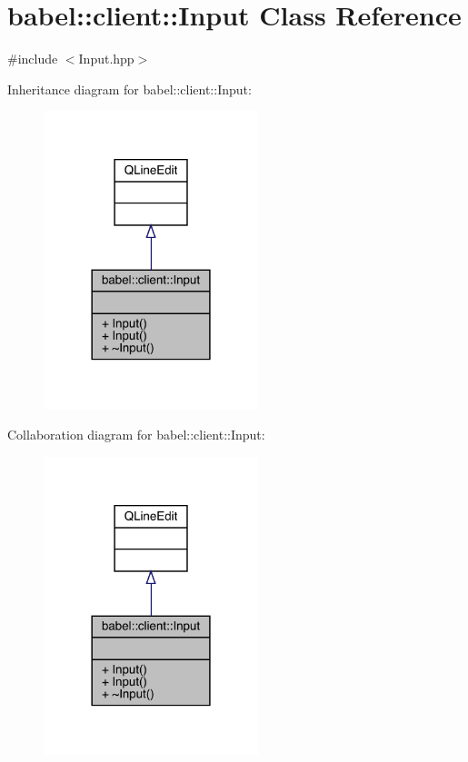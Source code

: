 \hypertarget{classbabel_1_1client_1_1_input}{}\section{babel\+:\+:client\+:\+:Input Class Reference}
\label{classbabel_1_1client_1_1_input}


{\ttfamily \#include $<$Input.\+hpp$>$}



Inheritance diagram for babel\+:\+:client\+:\+:Input\+:\nopagebreak
\begin{figure}[H]
\begin{center}
\leavevmode
\includegraphics[width=177pt]{classbabel_1_1client_1_1_input__inherit__graph}
\end{center}
\end{figure}


Collaboration diagram for babel\+:\+:client\+:\+:Input\+:\nopagebreak
\begin{figure}[H]
\begin{center}
\leavevmode
\includegraphics[width=177pt]{classbabel_1_1client_1_1_input__coll__graph}
\end{center}
\end{figure}
